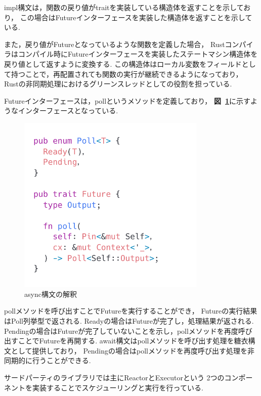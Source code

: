\documentclass[a4paper,11pt,openany]{jreport}
\newcommand\figref[1]{\textbf{図~\ref{fig:#1}}}
\begin{document}
impl構文は，関数の戻り値がtraitを実装している構造体を返すことを示しており，
この場合はFutureインターフェースを実装した構造体を返すことを示している.

また，戻り値がFutureとなっているような関数を定義した場合，
Rustコンパイラはコンパイル時にFutureインターフェースを実装したステートマシン構造体を戻り値として返すように変換する.
この構造体はローカル変数をフィールドとして持つことで，再配置されても関数の実行が継続できるようになっており，
Rustの非同期処理におけるグリーンスレッドとしての役割を担っている. 

Futureインターフェースは，pollというメソッドを定義しており，
\figref{future}に示すようなインターフェースとなっている.
\begin{figure}[tb]
	\centering
	\includegraphics[width=9cm, bb=0 0 800 550]{figures/future_trait.png}
	\caption{async構文の解釈}
	\label{fig:future}
\end{figure}
pollメソッドを呼び出すことでFutureを実行することができ，
Futureの実行結果はPoll列挙型で返される.
Readyの場合はFutureが完了し，処理結果が返される.
Pendingの場合はFutureが完了していないことを示し，pollメソッドを再度呼び出すことでFutureを再開する.
await構文はpollメソッドを呼び出す処理を糖衣構文として提供しており，
Pendingの場合はpollメソッドを再度呼び出す処理を非同期的に行うことができる.

サードパーティのライブラリでは主にReactorとExecutorという
2つのコンポーネントを実装することでスケジューリングと実行を行っている.
\end{document}
